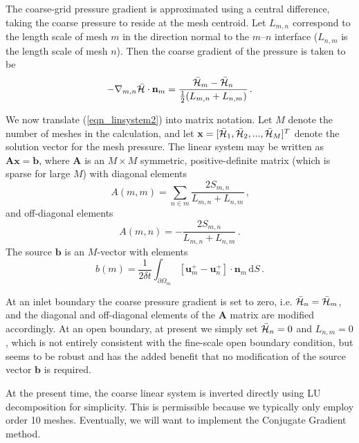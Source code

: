 \documentclass[11pt]{book}
\begin{document}
The coarse-grid pressure gradient is approximated using a central difference, taking the coarse pressure to reside at the mesh centroid.  Let $L_{m,n}$ correspond to the length scale of mesh $m$ in the direction normal to the $m$--$n$ interface ($L_{n,m}$ is the length scale of mesh $n$).  Then the coarse gradient of the pressure is taken to be
\begin{equation}
\label{eqn_coarsegrad}
-\nabla_{m,n}\bar{{\cal H}} \cdot \mathbf{n}_{m} = \frac{ \bar{{\cal H}}_m - \bar{{\cal H}}_n }{\frac{1}{2}(L_{m,n} + L_{n,m})} \,\mbox{.}
\end{equation}

We now translate (\ref{eqn_linsystem2}) into matrix notation.  Let $M$ denote the number of meshes in the calculation, and let $\mathbf{x} = [\bar{{\cal H}}_1,\bar{{\cal H}}_2,...,\bar{{\cal H}}_M]^T$ denote the solution vector for the mesh pressure.  The linear system may be written as $\mathbf{A}\mathbf{x} = \mathbf{b}$, where $\mathbf{A}$ is an $M \times M$ symmetric, positive-definite matrix (which is sparse for large $M$) with diagonal elements
\begin{equation}
\label{eqn_adiag}
A(m,m) = \sum_{n\in m} \frac{2 S_{m,n}}{L_{m,n} + L_{n,m}} \,\mbox{,}
\end{equation}
and off-diagonal elements
\begin{equation}
\label{eqn_aoffdiag}
A(m,n) = - \frac{2 S_{m,n}}{L_{m,n} + L_{n,m}} \,\mbox{.}
\end{equation}
The source $\mathbf{b}$ is an $M$-vector with elements
\begin{equation}
\label{eqn_belements}
b(m) = \frac{1}{2 \delta t} \int_{\partial \Omega_{m}} \left[ \mathbf{u}^+_m - \mathbf{u}^+_n \right] \cdot \mathbf{n}_{m} \,\mbox{d}S \,\mbox{.}
\end{equation}

At an inlet boundary the coarse pressure gradient is set to zero, i.e. $\bar{{\cal H}}_n = \bar{{\cal H}}_m$, and the diagonal and off-diagonal elements of the $\mathbf{A}$ matrix are modified accordingly.  At an open boundary, at present we simply set $\bar{{\cal H}}_n = 0$ and $L_{n,m} = 0$, which is not entirely consistent with the fine-scale open boundary condition, but seems to be robust and has the added benefit that no modification of the source vector $\mathbf{b}$ is required.

At the present time, the coarse linear system is inverted directly using LU decomposition for simplicity.  This is permissible because we typically only employ order 10 meshes.  Eventually, we will want to implement the Conjugate Gradient method.
\end{document}
